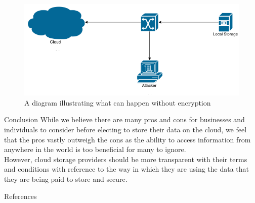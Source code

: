 \documentclass[final]{beamer}
\newlength{\onecolwid}
\begin{document}
\begin{frame}[t]
\begin{columns}[t]
\begin{column}{\onecolwid} %

\begin{figure}
\includegraphics[width=0.8\linewidth]{Maninthemiddle.png}
\caption{A diagram illustrating what can happen without encryption}
\end{figure}
\begin{alertblock}{Conclusion}
While we believe there are many pros and cons for businesses and individuals to consider before electing to store their data on the cloud, we feel that the pros vastly outweigh the cons as the ability to access information from anywhere in the world is too beneficial for many to ignore. \\
\vspace{2mm} However, cloud storage providers should be more transparent with their terms and conditions with reference to the way in which they are using the data that they are being paid to store and secure. 
\end{alertblock}




\begin{block}{References}

\nocite{*} %
\small{
\vspace{0.75in}}

\end{block}



\end{column} %

\end{columns} %

\end{frame} %
\end{document}
